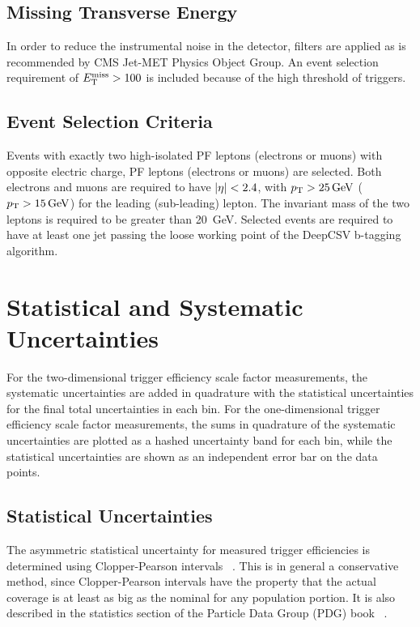 \subsection{Missing Transverse Energy}
In order to reduce the instrumental noise in the detector, \MET filters are applied as is recommended by CMS Jet-MET Physics Object Group.
An event selection requirement of $E_{\mathrm{T}}^{\text{miss}} > 100$ is included because of the high threshold of \MET triggers.
\subsection{Event Selection Criteria}
Events with exactly two high-\pT isolated PF leptons (electrons or muons) with opposite electric charge, PF leptons (electrons or muons) are selected. 
Both electrons and muons are required to have $\left\vert\eta\right\vert < 2.4$, with $\pT > \SI{25}{\GeV}$ ($\pT > \SI{15}{\GeV}$) for the leading (sub-leading) lepton.  
The invariant mass of the two leptons is required to be greater than \SI{20}{\GeV}.  
Selected events are required to have at least one jet passing the loose working point of the DeepCSV b-tagging algorithm.

\section{Statistical and Systematic Uncertainties}
For the two-dimensional trigger efficiency scale factor measurements, the systematic uncertainties are added in quadrature with the statistical uncertainties for the final total uncertainties in each bin. 
For the one-dimensional trigger efficiency scale factor measurements, the sums in quadrature of the systematic uncertainties are plotted as a hashed uncertainty band for each bin, while the statistical uncertainties are shown as an independent error bar on the data points.

\subsection{Statistical Uncertainties}
The asymmetric statistical uncertainty for measured trigger efficiencies is determined using Clopper-Pearson intervals ~\cite{bib:Cousins:2009kz}.
This is in general a conservative method, since Clopper-Pearson intervals have the property that the actual coverage is at least as big as the nominal for any population portion. 
It is also described in the statistics section of the Particle Data Group (PDG) book ~\cite{bib:PDG}.

